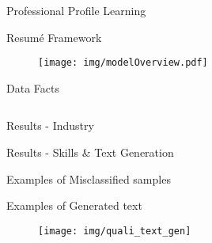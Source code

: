 \begin{section}[PPL]{Professional Profile Learning}
    \begin{frame}{Resumé Framework}
        \begin{figure}
            \centering
            \texttt{[image: img/modelOverview.pdf]}
            \label{fig:modelOverview}
        \end{figure}
    \end{frame}
    
    \begin{frame}{Data Facts}
        \begin{columns}
            \begin{column}{.3\textwidth}
                
            \end{column}
            \begin{column}{.7\textwidth}
                
            \end{column}
        \end{columns}
    \end{frame}
    
    \begin{frame}{Results - Industry}
        
    \end{frame}
    
    \begin{frame}{Results - Skills \& Text Generation}
        

    \end{frame}
    \begin{frame}{Examples of Misclassified samples}
            
    \end{frame}
    
    \begin{frame}{Examples of Generated text}
        \begin{figure}
            \centering
            \texttt{[image: img/quali\_text\_gen]}
            \label{fig:text_gen_quali}
        \end{figure}
    \end{frame}
    

\end{section}
